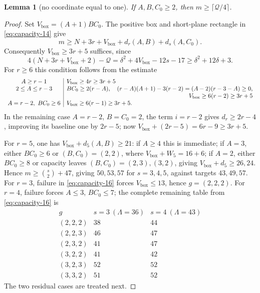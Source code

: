 \documentclass[11pt]{article}
\newtheorem{lemma}[theorem]{Lemma}
\theoremstyle{definition}
\theoremstyle{remark}
\theoremstyle{plain}
\begin{document}
\begin{lemma}[no coordinate equal to one]\label{res:A3.2}
If $A,B,C_0\ge2$, then $m\ge\lceil \mathcal Q/4\rceil$.
\end{lemma}
\begin{proof}
Set $V_{\mathrm{box}}=(A+1)BC_0$.  The positive box and short-plane rectangle in
\eqref{eq:capacity-14} give
\[
 m\ge N+3r+V_{\mathrm{box}}+d_r(A,B)+d_s(A,C_0).\tag{3.16}\label{eq:capacity-16}
\]
Consequently $V_{\mathrm{box}}\ge3r+5$ suffices, since
\[
 4(N+3r+V_{\mathrm{box}}+2)-\mathcal Q=\delta^2+4V_{\mathrm{box}}-12s-17\ge \delta^2+12\delta+3.\tag{3.17}\label{eq:capacity-17}
\]
For $r\ge6$ this condition follows from the estimate
\[
\begin{array}{c|l}
A\ge r-1&V_{\mathrm{box}}\ge4r\ge3r+5\\
2\le A\le r-3&BC_0\ge2(r-A),\quad
 (r-A)(A+1)-3(r-2)=(A-2)(r-3-A)\ge0,\\
 &\hfill V_{\mathrm{box}}\ge6(r-2)\ge3r+5\\
A=r-2,\ BC_0\ge6&V_{\mathrm{box}}\ge6(r-1)\ge3r+5.
\end{array}
\]
In the remaining case $A=r-2$, $B=C_0=2$, the term $i=r-2$ gives
$d_r\ge2r-4$, improving its baseline one by $2r-5$; now
$V_{\mathrm{box}}+(2r-5)=6r-9\ge3r+5$.

For $r=5$, one has $V_{\mathrm{box}}+d_5(A,B)\ge21$: if $A\ge4$ this is immediate;
if $A=3$, either $BC_0\ge6$ or $(B,C_0)=(2,2)$, where $V_{\mathrm{box}}+W_5=16+6$;
if $A=2$, either $BC_0\ge8$ or capacity leaves $(B,C_0)=(2,3),(3,2)$,
giving $V_{\mathrm{box}}+d_5\ge26,24$.  Hence $m\ge\binom s2+47$, giving
$50,53,57$ for $s=3,4,5$, against targets $43,49,57$.
For $r=3$, failure in \eqref{eq:capacity-16} forces $V_{\mathrm{box}}\le13$, hence $g=(2,2,2)$.
For $r=4$, failure forces $A\le3$, $BC_0\le7$; the complete remaining
table from \eqref{eq:capacity-16} is
\[
\begin{array}{c|rr}
g&s=3\ (\Lambda=36)&s=4\ (\Lambda=43)\\\hline
(2,2,2)&38&44\\
(2,2,3)&46&47\\
(2,3,2)&41&47\\
(3,2,2)&41&42\\
(3,2,3)&52&52\\
(3,3,2)&51&52
\end{array}
\]
The two residual cases are treated next. \end{proof}
\end{document}
